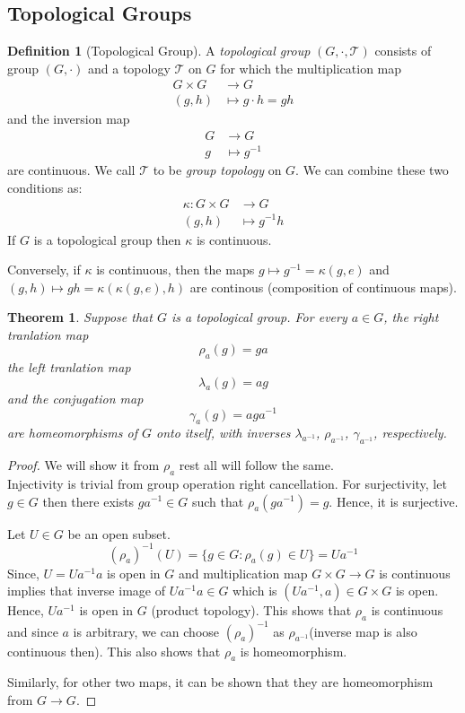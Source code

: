 \documentclass[12pt,reqno]{amsart}
\theoremstyle{plain}
\newtheorem{thm}{Theorem}
\theoremstyle{definition}
\newtheorem{defn}{Definition}
\newcommand{\cal}[1]{\mathcal{#1}}
\begin{document}
\subsection{Topological Groups}
\begin{defn}[Topological Group]
    A {\it topological group} $(G,\cdot,\cal T)$ consists of group $(G,\cdot)$ and a topology $\cal T$ on $G$ for which the multiplication map
    $$
    \begin{aligned}
        G \times G &\to G \\
        (g,h) &\mapsto g \cdot h = gh
    \end{aligned} 
    $$
    and the inversion map
    $$
    \begin{aligned}
        G &\to G \\
        g &\mapsto g^{-1}
    \end{aligned} 
    $$
    are continuous. We call $\cal T$ to be {\it group topology} on $G$. We can combine these two conditions as:
    $$
    \begin{aligned}
        \kappa \colon G \times G &\to G \\
        (g,h) &\mapsto g^{-1}h
    \end{aligned} 
    $$
    If $G$ is a topological group then $\kappa$ is continuous.
\end{defn}
Conversely, if $\kappa$ is continuous, then the maps $g \mapsto g^{-1} = \kappa(g,e)$ and $(g,h) \mapsto gh = \kappa(\kappa(g,e),h)$ are continous (composition of continuous maps).

\begin{thm}
    Suppose that $G$ is a topological group. For every $a \in G$, the {\it right tranlation map}
    $$ \rho_a(g) = ga$$
    the {\it left tranlation map}
    $$ \lambda_a(g) = ag$$
    and the {\it conjugation map}
    $$ \gamma_a(g) = aga^{-1}$$
    are homeomorphisms of $G$ onto itself, with inverses $\lambda_{a^{-1}}$, $\rho_{a^{-1}}$, $\gamma_{a^{-1}}$, respectively.
\end{thm}
\begin{proof}
    We will show it from $\rho_a$ rest all will follow the same.\\
    Injectivity is trivial from group operation right cancellation. For surjectivity, let $g \in G$ then there exists $ga^{-1}\in G$ such that $\rho_a(ga^{-1}) = g$. Hence, it is surjective.

    Let $U \in G$ be an open subset. 
    $$ (\rho_a)^{-1}(U) = \{g \in G \colon \rho_a(g) \in U\} = Ua^{-1}$$
    Since, $U = Ua^{-1}a$ is open in $G$ and multiplication map $G \times G \to G$ is continuous implies that inverse image of $Ua^{-1}a \in G$ which is $(Ua^{-1},a) \in G \times G$ is open. Hence, $Ua^{-1}$ is open in $G$ (product topology). This shows that $\rho_a$ is continuous and since $a$ is arbitrary, we can choose $(\rho_a)^{-1}$ as $\rho_{a^{-1}}$(inverse map is also continuous then). This also shows that $\rho_a$ is homeomorphism.

    Similarly, for other two maps, it can be shown that they are homeomorphism from $G \to G$.
\end{proof}
\end{document}
